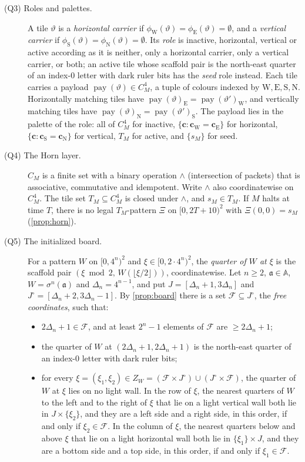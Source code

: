 \begin{description}
\item[(Q3) Roles and palettes.] A tile $\vartheta$ is a \emph{horizontal carrier} if $\phi_{\mathrm W}(\vartheta)=\phi_{\mathrm E}(\vartheta)=\emptyset$, and a \emph{vertical carrier} if $\phi_{\mathrm S}(\vartheta)=\phi_{\mathrm N}(\vartheta)=\emptyset$. Its \emph{role} is inactive, horizontal, vertical or active according as it is neither, only a horizontal carrier, only a vertical carrier, or both; an active tile whose scaffold pair is the north-east quarter of an index-$0$ letter with dark ruler bits has the \emph{seed} role instead. Each tile carries a payload $\operatorname{pay}(\vartheta)\in C_M^4$, a tuple of colours indexed by $\mathrm W,\mathrm E,\mathrm S,\mathrm N$. Horizontally matching tiles have $\operatorname{pay}(\vartheta)_{\mathrm E}=\operatorname{pay}(\vartheta')_{\mathrm W}$, and vertically matching tiles have $\operatorname{pay}(\vartheta)_{\mathrm N}=\operatorname{pay}(\vartheta')_{\mathrm S}$. The payload lies in the palette of the role: all of $C_M^4$ for inactive, $\{\mathbf c:\mathbf c_{\mathrm W}=\mathbf c_{\mathrm E}\}$ for horizontal, $\{\mathbf c:\mathbf c_{\mathrm S}=\mathbf c_{\mathrm N}\}$ for vertical, $T_M$ for active, and $\{s_M\}$ for seed.
\item[(Q4) The Horn layer.] $C_M$ is a finite set with a binary operation $\wedge$ (intersection of packets) that is associative, commutative and idempotent. Write $\wedge$ also coordinatewise on $C_M^4$. The tile set $T_M\subseteq C_M^4$ is closed under $\wedge$, and $s_M\in T_M$. If $M$ halts at time $T$, there is no legal $T_M$-pattern $\Xi$ on $[0,2T+10)^2$ with $\Xi(0,0)=s_M$ (\cref{prop:horn}).
\item[(Q5) The initialized board.] For a pattern $W$ on $[0,4^n)^2$ and $\xi\in[0,2\cdot4^n)^2$, the \emph{quarter of $W$ at $\xi$} is the scaffold pair $(\xi\bmod 2,\,W(\lfloor\xi/2\rfloor))$, coordinatewise. Let $n\ge2$, $\mathfrak a\in\mathbb A$, $W=\sigma^n(\mathfrak a)$ and $\Delta_n=4^{n-1}$, and put $J=[\Delta_n+1,3\Delta_n]$ and $J^\circ=[\Delta_n+2,3\Delta_n-1]$. By \cref{prop:board} there is a set $\mathcal F\subseteq J^\circ$, the \emph{free coordinates}, such that:
\begin{itemize}
\item[(a)] $2\Delta_n+1\in\mathcal F$, and at least $2^n-1$ elements of $\mathcal F$ are $\ge2\Delta_n+1$;
\item[(b)] the quarter of $W$ at $(2\Delta_n+1,2\Delta_n+1)$ is the north-east quarter of an index-$0$ letter with dark ruler bits;
\item[(c)] for every $\xi=(\xi_1,\xi_2)\in Z_W=(\mathcal F\times J^\circ)\cup(J^\circ\times\mathcal F)$, the quarter of $W$ at $\xi$ lies on no light wall. In the row of $\xi$, the nearest quarters of $W$ to the left and to the right of $\xi$ that lie on a light vertical wall both lie in $J\times\{\xi_2\}$, and they are a left side and a right side, in this order, if and only if $\xi_2\in\mathcal F$. In the column of $\xi$, the nearest quarters below and above $\xi$ that lie on a light horizontal wall both lie in $\{\xi_1\}\times J$, and they are a bottom side and a top side, in this order, if and only if $\xi_1\in\mathcal F$.
\end{itemize}
\end{description}
